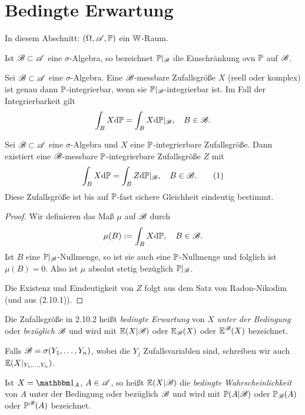 \section{Bedingte Erwartung}
In diesem Abschnitt: $(\Omega, \mathscr{A}, \mathbb{P})$ ein $\mathbb{W}$-Raum.

Ist $\mathscr{B} \subset \mathscr{A}$ eine $\sigma$-Algebra, so bezeichnet $\mathbb{P}|_{\mathscr{B}}$ die
Einschränkung ovn $\mathbb{P}$ auf $\mathscr{B}$.

\begin{prgp}[Aufgabe]
  Sei $\mathscr{B} \subset \mathscr{A}$ eine $\sigma$-Algebra. Eine $\mathscr{B}$-messbare Zufallsgröße
  $X$ (reell oder komplex) ist genau dann $\mathbb{P}$-integrierbar, wenn sie
  $\mathbb{P}|_{\mathscr{B}}$-integrierbar ist. Im Fall der Integrierbarkeit gilt
  \[ \int_B X \mathrm{d} \mathbb{P} = \int_B X \mathrm{d} \mathbb{P}|_{\mathscr{B}}, \quad B \in \mathscr{B}. \]
\end{prgp}

\begin{thm}
  Sei $\mathscr{B} \subset \mathscr{A}$ eine $\sigma$-Algebra und $X$ eine $\mathbb{P}$-integrierbare
  Zufallsgröße. Dann existiert eine $\mathscr{B}$-messbare $\mathbb{P}$-integrierbare
  Zufallsgröße $Z$ mit
  \[ \int_B X \mathrm{d} \mathbb{P} = \int_B Z \mathrm{d} \mathbb{P}|_{\mathscr{B}},  \quad B \in \mathscr{B}.
    \tag{1} \]
  Diese Zufallsgröße ist bis auf $\mathbb{P}$-fast sichere Gleichheit eindeutig
  bestimmt.
\end{thm}

\begin{proof}
  Wir definieren das Maß $\mu$ auf $\mathscr{B}$ durch
  \[ \mu( B) := \int_B X \mathrm{d} \mathbb{P}, \quad B \in \mathscr{B}. \]
  Ist $B$ eine $\mathbb{P}|_{\mathscr{B}}$-Nullmenge, so ist sie auch eine $\mathbb{P}$-Nullmenge und
  folglich ist $\mu(B) = 0$. Also ist $\mu$ absolut stetig bezüglich $\mathbb{P}|_{\mathscr{B}}$.

  Die Existenz und Eindeutigkeit von $Z$ folgt aus dem Satz von Radon-Nikodim
  (und aus (2.10.1)).
\end{proof}

\begin{defn}
  Die Zufallsgröße in 2.10.2 heißt \emph{bedingte Erwartung} von $X$ \emph{unter
    der Bedingung} oder \emph{bezüglich} $\mathscr{B}$ und wird mit $\mathbb{E}(X|\mathscr{B})$ oder
  $\mathbb{E}_{\mathscr{B}}(X)$ oder $\mathbb{E}^{\mathscr{B}}(X)$ bezeichnet.

  Falls $\mathscr{B} = \sigma( Y_1, \ldots, Y_n)$, wobei die $Y_j$ Zufallsvariablen
  sind, schreiben wir auch $\mathbb{E}(X|_{Y_1, \ldots, Y_n})$.

  Ist $X = \ind_A$, $A \in \mathscr{A}$, so heißt $\mathbb{E}(X|\mathscr{B})$ die \emph{bedingte
    Wahrscheinlichkeit} von $A$ unter der Bedingung oder bezüglich $\mathscr{B}$ und
  wird mit $\mathbb{P}(A|\mathscr{B})$ oder $\mathbb{P}_{\mathscr{B}}(A)$ oder $\mathbb{P}^{\mathscr{B}}(A)$ bezeichnet.
\end{defn}

